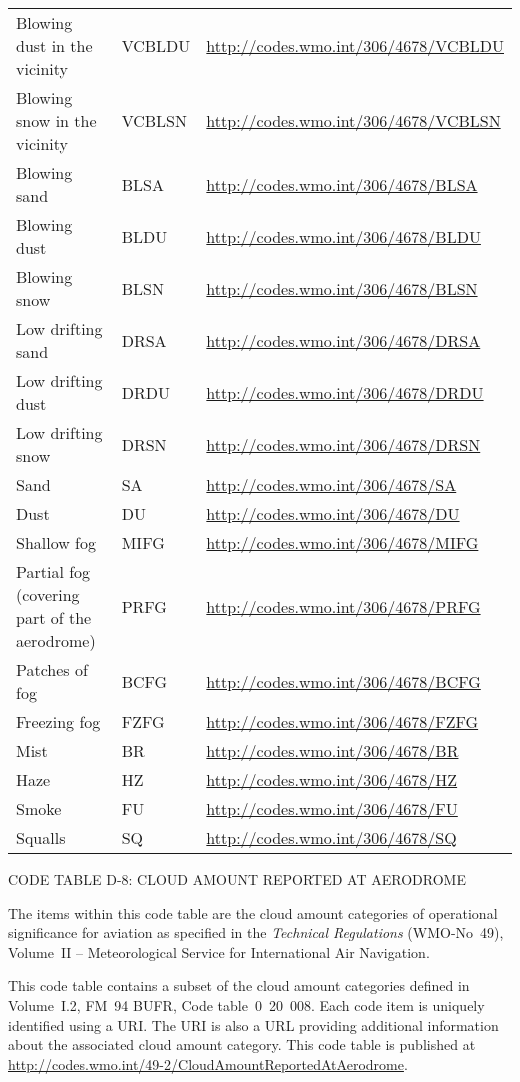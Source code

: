\begin{longtable}[]{@{}lll@{}}
Blowing dust in the vicinity & VCBLDU & \url{http://codes.wmo.int/306/4678/VCBLDU}\tabularnewline
Blowing snow in the vicinity & VCBLSN & \url{http://codes.wmo.int/306/4678/VCBLSN}\tabularnewline
Blowing sand & BLSA & \url{http://codes.wmo.int/306/4678/BLSA}\tabularnewline
Blowing dust & BLDU & \url{http://codes.wmo.int/306/4678/BLDU}\tabularnewline
Blowing snow & BLSN & \url{http://codes.wmo.int/306/4678/BLSN}\tabularnewline
Low drifting sand & DRSA & \url{http://codes.wmo.int/306/4678/DRSA}\tabularnewline
Low drifting dust & DRDU & \url{http://codes.wmo.int/306/4678/DRDU}\tabularnewline
Low drifting snow & DRSN & \url{http://codes.wmo.int/306/4678/DRSN}\tabularnewline
Sand & SA & \url{http://codes.wmo.int/306/4678/SA}\tabularnewline
Dust & DU & \url{http://codes.wmo.int/306/4678/DU}\tabularnewline
Shallow fog & MIFG & \url{http://codes.wmo.int/306/4678/MIFG}\tabularnewline
Partial fog (covering part of the aerodrome) & PRFG & \url{http://codes.wmo.int/306/4678/PRFG}\tabularnewline
Patches of fog & BCFG & \url{http://codes.wmo.int/306/4678/BCFG}\tabularnewline
Freezing fog & FZFG & \url{http://codes.wmo.int/306/4678/FZFG}\tabularnewline
Mist & BR & \url{http://codes.wmo.int/306/4678/BR}\tabularnewline
Haze & HZ & \url{http://codes.wmo.int/306/4678/HZ}\tabularnewline
Smoke & FU & \url{http://codes.wmo.int/306/4678/FU}\tabularnewline
Squalls & SQ & \url{http://codes.wmo.int/306/4678/SQ}\tabularnewline
\bottomrule
\end{longtable}

CODE TABLE D-8: CLOUD AMOUNT REPORTED AT AERODROME

The items within this code table are the cloud amount categories of operational significance for aviation as specified in the \emph{Technical Regulations} (WMO-No~49), Volume~II -- Meteorological Service for International Air Navigation.

This code table contains a subset of the cloud amount categories defined in Volume~I.2, FM~94 BUFR, Code table~0~20~008. Each code item is uniquely identified using a URI. The URI is also a URL providing additional information about the associated cloud amount category. This code table is published at \url{http://codes.wmo.int/49-2/CloudAmountReportedAtAerodrome}.

